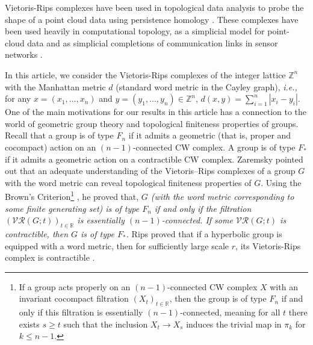 \documentclass{amsart}
\theoremstyle{definition}
\theoremstyle{remark}
\numberwithin{equation}{section}
\newcommand{\vr}[2]{\mathcal{VR}(#1;#2)}
\def\R{{\mathbb{R}}}
\def\Z{{\mathbb{Z}}}
\begin{document}
Vietoris-Rips complexes  have been used  in  topological data analysis to probe the shape of a point cloud data using persistence homology 
\cite{Bauer2021, Carlsson2009,  ZomorodianCarlsson2005,Zomorodian2010}.  These complexes  have  been used heavily in computational topology, as a simplicial
model for point-cloud data \cite{Carlsson06, CarlssonZomorodian2005,CarlssonIshkhanovDeSilvaZomorodian2008,  DesilvaCarlsson2004} and as simplicial completions of
communication links in sensor networks \cite{DesilvaGhrist2006, DesilvaGhrist2007, Muhammad2007}. 


In this article, we consider the Vietoris-Rips complexes of the integer lattice $\Z^n$ with the Manhattan metric $d$ (standard word metric in the Cayley graph), {\it i.e.,} for any $x = (x_1, \ldots, x_n)$ and $y = (y_1, \ldots, y_n) \in \Z^n$, $d(x, y) = \sum_{i = 1}^n |x_i - y_i|$.  One of the main motivations for our results in this article has a connection to the world of geometric group theory and topological
finiteness properties of groups. Recall that a group is of type $F_n$ if it admits a geometric (that is, proper and cocompact) action on an $(n-1)$-connected CW complex.  A group is of type $F_{\ast}$ if it admits a geometric action on a
contractible CW complex. Zaremsky \cite{Zaremsky2022} pointed out that an adequate understanding of the Vietoris–Rips complexes of a group $G$ with the word metric can reveal topological finiteness properties of $G$. Using the Brown’s Criterion\footnote{If a group acts properly on an $(n-1)$-connected CW complex $X$ with an invariant
	cocompact filtration $(X_t)_{t \in \R}$, then the group is of type $F_n$ if and only if this filtration is
	essentially $(n-1)$-connected, meaning for all $t$ there exists $s \geq t$ such that the inclusion
	$X_t \to X_s$ induces the trivial map in $\pi_k$ for $k\leq n-1$.} \cite{Brown1985}, he \cite[Lemma 3.6]{Zaremsky2022} proved that,  {\it $G$ (with the word metric corresponding to some finite generating
	set) is of type $F_n$ if and only if the filtration $(\vr{G}{t})_{t \in \R}$ is essentially $(n-1)$-connected. If some $\vr{G}{t}$ is contractible, then $G$ is of type $F_{\ast}$.}
Rips proved that if a hyperbolic group is equipped with a word metric, then for sufficiently large scale $r$, its Vietoris-Rips complex is contractible \cite[Proposition III.$\Gamma$.3.23]{Brid1999}.
\end{document}
